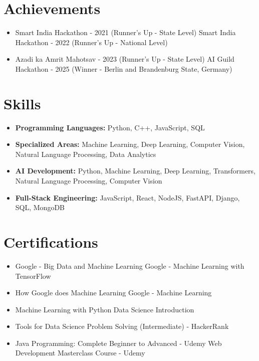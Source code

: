 \documentclass[a4paper,10pt]{article}
\begin{document}
\section*{Achievements}
\begin{itemize}
\item Smart India Hackathon - 2021 (Runner's Up - State Level) \hfill Smart India Hackathon - 2022 (Runner's Up - National Level)
\item Azadi ka Amrit Mahotsav - 2023 (Runner's Up - State Level) \hfill AI Guild Hackathon - 2025 (Winner - Berlin and Brandenburg State, Germany)
\end{itemize}

\section*{Skills}
\begin{itemize}
  \item \textbf{Programming Languages:} Python, C++, JavaScript, SQL
  \item \textbf{Specialized Areas:} Machine Learning, Deep Learning, Computer Vision, Natural Language Processing, Data Analytics
  \item \textbf{AI Development:} Python, Machine Learning, Deep Learning, Transformers, Natural Language Processing, Computer Vision
  \item \textbf{Full-Stack Engineering:} JavaScript, React, NodeJS, FastAPI, Django, SQL, MongoDB
\end{itemize}

\section*{Certifications}
\begin{itemize}
\item Google - Big Data and Machine Learning \hfill Google - Machine Learning with TensorFlow
\item How Google does Machine Learning \hfill Google - Machine Learning
\item Machine Learning with Python \hfill Data Science Introduction
\item Tools for Data Science \hfill Problem Solving (Intermediate) - HackerRank
\item Java Programming: Complete Beginner to Advanced - Udemy \hfill Web Development Masterclass Course - Udemy
\end{itemize}
\end{document}
